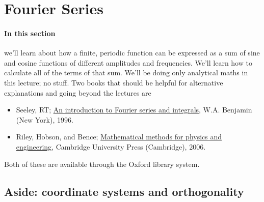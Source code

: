 \documentclass[11pt,twoside,a4paper]{article}
\begin{document}
\section{Fourier Series}
\label{sec:fourierseries}

\paragraph{In this section} we'll learn about how a finite, periodic
function can be expressed as a sum of sine and cosine functions of
different amplitudes and frequencies. We'll learn how to calculate all
of the terms of that sum.  We'll be doing only analytical maths in
this lecture; no \Mlab stuff.  Two books that should be helpful for
alternative explanations and going beyond the lectures are
\begin{itemize}
\item Seeley, RT; \underline{An introduction to Fourier series and
    integrals}, W.A. Benjamin (New York), 1996.
\item Riley, Hobson, and Bence; \underline{Mathematical methods for
    physics and engineering}, Cambridge University Press (Cambridge),
  2006.
\end{itemize}
Both of these are available through the Oxford library system.

\subsection{Aside: coordinate systems and orthogonality}
\end{document}
